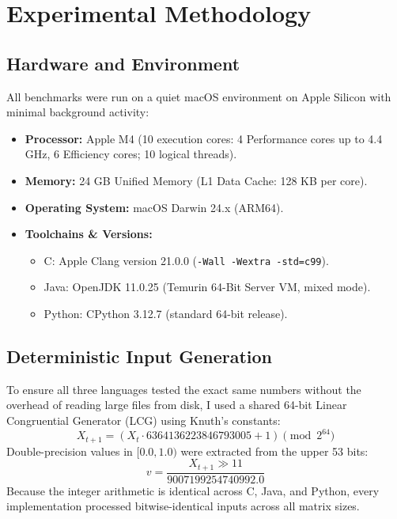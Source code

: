\documentclass[10pt,conference,a4paper]{IEEEtran}
\begin{document}
\section{Experimental Methodology}

\subsection{Hardware and Environment}
All benchmarks were run on a quiet macOS environment on Apple Silicon with minimal background activity:
\begin{itemize}
    \item \textbf{Processor:} Apple M4 (10 execution cores: 4 Performance cores up to 4.4 GHz, 6 Efficiency cores; 10 logical threads).
    \item \textbf{Memory:} 24 GB Unified Memory (L1 Data Cache: 128 KB per core).
    \item \textbf{Operating System:} macOS Darwin 24.x (ARM64).
    \item \textbf{Toolchains \& Versions:}
    \begin{itemize}
        \item C: Apple Clang version 21.0.0 (\texttt{-Wall -Wextra -std=c99}).
        \item Java: OpenJDK 11.0.25 (Temurin 64-Bit Server VM, mixed mode).
        \item Python: CPython 3.12.7 (standard 64-bit release).
    \end{itemize}
\end{itemize}

\subsection{Deterministic Input Generation}
To ensure all three languages tested the exact same numbers without the overhead of reading large files from disk, I used a shared 64-bit Linear Congruential Generator (LCG) using Knuth's constants:
\begin{equation}
X_{t+1} = (X_t \cdot 6364136223846793005 + 1) \pmod{2^{64}}
\end{equation}
Double-precision values in $[0.0, 1.0)$ were extracted from the upper 53 bits:
\begin{equation}
v = \frac{X_{t+1} \gg 11}{9007199254740992.0}
\end{equation}
Because the integer arithmetic is identical across C, Java, and Python, every implementation processed bitwise-identical inputs across all matrix sizes.
\end{document}
